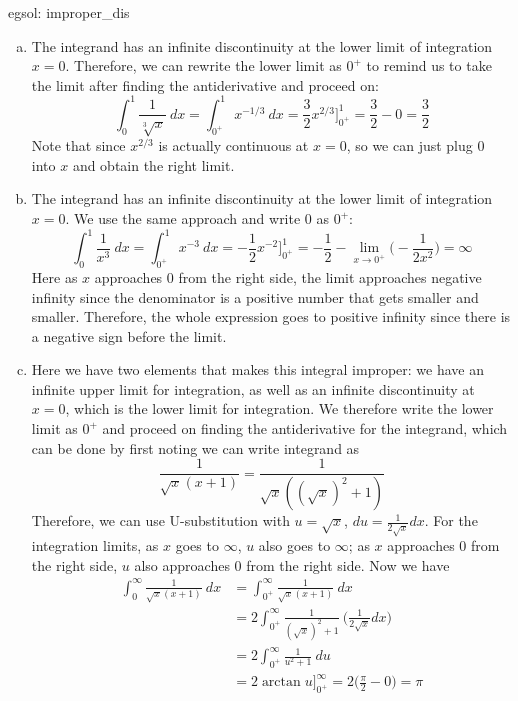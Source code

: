 \begin{egsol}[]{egsol: improper_dis}
    \begin{enumerate}[a)]
        \allowdisplaybreaks
        \item The integrand has an infinite discontinuity at the lower limit of integration $x = 0$.  Therefore, we can rewrite the lower limit as $0^+$ to remind us to take the limit after finding the antiderivative and proceed on: 
        \[\int_0^1 \frac{1}{\sqrt[3]{x}}~dx = \int_{0^+}^1 x^{-1/3}~dx = \frac{3}{2}x^{2/3}\Big]_{0^+}^1 = \frac{3}{2} - 0 = \frac{3}{2}\]
        Note that since $x^{2/3}$ is actually continuous at $x = 0$, so we can just plug $0$ into $x$ and obtain the right limit.
        \item The integrand has an infinite discontinuity at the lower limit of integration $x = 0$.  We use the same approach and write $0$ as $0^+$:
        \[\int_0^1 \frac{1}{x^3}~dx = \int_{0^+}^1 x^{-3}~dx = -\frac{1}{2}x^{-2}\Big]_{0^+}^1 = -\frac{1}{2} - \lim_{x \rightarrow 0^+} \Big(-\frac{1}{2x^2}\Big) = \infty\]
        Here as $x$ approaches $0$ from the right side, the limit approaches negative infinity since the denominator is a positive number that gets smaller and smaller.  Therefore, the whole expression goes to positive infinity since there is a negative sign before the limit.
        \item Here we have two elements that makes this integral improper: we have an infinite upper limit for integration, as well as an infinite discontinuity at $x = 0$, which is the lower limit for integration.  We therefore write the lower limit as $0^+$ and proceed on finding the antiderivative for the integrand, which can be done by first noting we can write integrand as 
        \[\frac{1}{\sqrt{x}(x+1)} = \frac{1}{\sqrt{x}((\sqrt{x})^2+1)}\]
        Therefore, we can use U-substitution with $u = \sqrt{x}$, $du = \frac{1}{2\sqrt{x}}dx$.  For the integration limits, as $x$ goes to $\infty$, $u$ also goes to $\infty$; as $x$ approaches $0$ from the right side, $u$ also approaches $0$ from the right side.  Now we have
        \begin{align*}
            \int_0^{\infty} \frac{1}{\sqrt{x}(x+1)}~dx &= \int_{0^+}^{\infty} \frac{1}{\sqrt{x}(x+1)}~dx\\
            &= 2\int_{0^+}^{\infty} \frac{1}{(\sqrt{x})^2+1}~\Big(\frac{1}{2\sqrt{x}}dx\Big)\\
            &= 2\int_{0^+}^{\infty} \frac{1}{u^2+1}~du\\
            &= 2 \arctan u\Big]_{0^+}^{\infty} = 2\Big(\frac{\pi}{2} - 0\Big) = \pi

\end{align*}
\end{enumerate}
\end{egsol}
